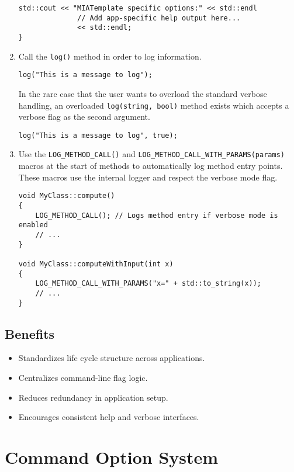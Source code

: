 \begin{enumerate}
\begin{lstlisting}[style=cppstyle]
    std::cout << "MIATemplate specific options:" << std::endl
              // Add app-specific help output here...
              << std::endl;
}
	\end{lstlisting}
 
	\item Call the \texttt{log()} method in order to log information.
	\begin{lstlisting}[style=cppstyle]
log("This is a message to log");
	\end{lstlisting}
	In the rare case that the user wants to overload the standard verbose handling, an overloaded \texttt{log(string, bool)} method exists which accepts a verbose flag as the second argument.
	\begin{lstlisting}[style=cppstyle]
log("This is a message to log", true);
	\end{lstlisting}
 
	 \item Use the \texttt{LOG_METHOD_CALL()} and \texttt{LOG_METHOD_CALL_WITH_PARAMS(params)} macros at the start of methods to automatically log method entry points. These macros use the internal logger and respect the verbose mode flag.
	\begin{lstlisting}[style=cppstyle]
void MyClass::compute()
{
    LOG_METHOD_CALL(); // Logs method entry if verbose mode is enabled
    // ...
}

void MyClass::computeWithInput(int x)
{
    LOG_METHOD_CALL_WITH_PARAMS("x=" + std::to_string(x));
    // ...
}
	\end{lstlisting}
\end{enumerate}

\subsection*{Benefits}
\begin{itemize}
	\item Standardizes life cycle structure across applications.
	\item Centralizes command-line flag logic.
	\item Reduces redundancy in application setup.
	\item Encourages consistent help and verbose interfaces.
\end{itemize}










\section{Command Option System}
\label{sec:cmd-option-system}

